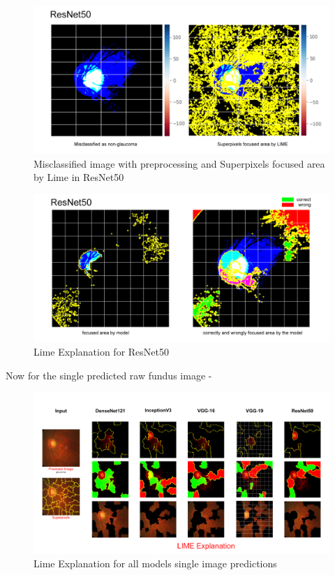 \vspace{5mm}
\begin{figure}[hbt!]
\centering
\includegraphics[scale=0.5]{images/fig-50.png}
\caption{Misclassified image with preprocessing and Superpixels focused area by Lime in ResNet50}
\label{fig:x Misclassified image with preprocessing and Superpixels focused area by Lime in ResNet50}
\end{figure}

\vspace{5mm}
\begin{figure}[hbt!]
\centering
\includegraphics[scale=0.5]{images/fig-51.png}
\caption{Lime Explanation for ResNet50}
\label{fig:x Lime Explanation for ResNet50}
\end{figure}

\newpage
\vspace{5mm}
Now for the single predicted raw fundus image -

\vspace{5mm}
\begin{figure}[hbt!]
\centering
\includegraphics[scale=0.20]{images/fig-52.png}
\caption{Lime Explanation for all models single image predictions}
\label{fig:x Lime Explanation for all models single image predictions}
\end{figure}

